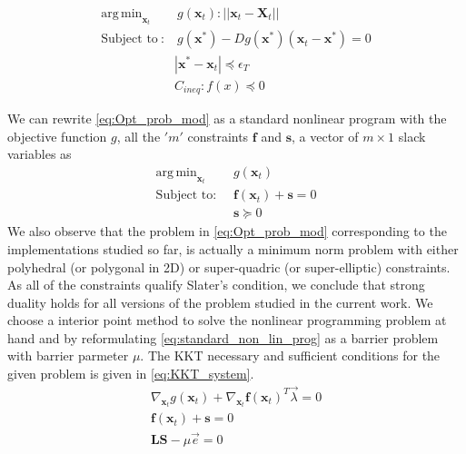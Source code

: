 \documentclass[12pt,a4]{article}
\DeclareMathOperator*{\argmin}{arg\,min}
\begin{document}
\begin{align}\label{eq:Opt_prob_mod}
 \argmin_{\textbf{x}_t} & ~g(\textbf{x}_t): \vert \vert \textbf{x}_t-\textbf{X}_t\vert \vert\\
\text{Subject to}~: &~ g(\textbf{x}^*)-Dg(\textbf{x}^*) (\textbf{x}_t-\textbf{x}^*) =0\nonumber\\ 
					& | \textbf{x}^*-\textbf{x}_t| \preceq  \epsilon_T \nonumber\\
					& C_{ineq}: f(x) \preceq 0 \nonumber
\end{align}

We can rewrite \cref{eq:Opt_prob_mod} as a standard nonlinear program with the objective function $g$, all the $'m'$ constraints $\textbf{f}$ and $\textbf{s}$, a vector of $m\times 1$ slack variables as 
\begin{align} \label{eq:standard_non_lin_prog}
\argmin_{\textbf{x}_t} ~& g(\textbf{x}_t) \\
\text{Subject to: }~ & \textbf{f}(\textbf{x}_t)+\textbf{s} =0 \nonumber\\
& \textbf{s}\succeq 0\nonumber
\end{align} 
We also observe that the problem in \cref{eq:Opt_prob_mod} corresponding to the implementations studied so far, is actually a minimum norm problem with either polyhedral (or polygonal in 2D)  or super-quadric (or super-elliptic) constraints. As all of the constraints qualify Slater's condition, we conclude that strong duality holds for all  versions of the problem studied in the current work. We choose a interior point method to solve the nonlinear programming problem at hand and by reformulating \cref{eq:standard_non_lin_prog} as a barrier problem with barrier parmeter $\mu$. The KKT necessary and sufficient conditions for the given problem is given in \cref{eq:KKT_system}.
\begin{align}\label{eq:KKT_system}
\nabla_{\textbf{x}_t}g(\textbf{x}_t)+\nabla_{\textbf{x}_t}\textbf{f}(\textbf{x}_t)^T \vec{\lambda} =0 \nonumber \\
\textbf{f}(\textbf{x}_t)+\textbf{s}=0 \\
\textbf{L}\textbf{S}-\mu \vec{e}=0 \nonumber
\end{align}
\end{document}
